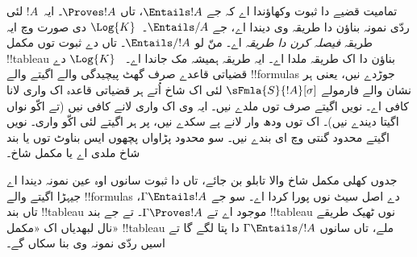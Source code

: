 \documentclass[../../../include/open-logic-section]{subfiles}
\begin{document}


\begin{explain}
  تمامیت قضیے دا ثبوت وکھاؤندا اے کہ جے $\Entails !A$، تاں
  $\Proves !A$۔ ایہ~$!A$ لئی ردّی نمونہ بناؤن دا طریقہ وی دیندا اے،
  جے $\Entails/ A$۔~$\Log{K}$ دی صورت وچ ایہ طریقہ \emph{فیصلہ کرن
    دا طریقہ} اے۔ منّ لو $\Entails/ !A$۔ تاں
   دے ثبوت توں مکمل !!{tableau}
  بناؤن دا اک طریقہ ملدا اے۔ ایہ طریقہ ہمیشہ مک جاندا اے۔
  ~$\Log{K}$ دے قضیاتی قاعدے صرف گھٹ پیچیدگی والے اگیتے والے
  !!{formula}s جوڑدے نیں، یعنی ہر نشان والے فارمولے $\sFmla{S}{!A}[\sigma]$
  لئی اک شاخ اُتے ہر قضیاتی قاعدہ اک واری لانا کافی اے۔ نویں اگیتے صرف
   توں ملدے نیں۔
  ایہ وی اک واری لانے کافی نیں (تے اکّو نواں اگیتا دیندے نیں)۔
   اک توں ودھ وار لانے پے
  سکدے نیں، پر ہر اگیتے لئی اکّو واری۔ نویں اگیتے محدود گنتی وچ ای
  بندے نیں۔ سو محدود پڑاواں پچھوں ایس بناوٹ توں یا بند شاخ ملدی اے
  یا مکمل شاخ۔

جدوں کھلی مکمل شاخ والا تابلو بن جائے، تاں
   دا ثبوت سانوں اوہ عین نمونہ
  دیندا اے جیہڑا اگیتے والے !!{formula}s دے اصل سیٹ نوں پورا کردا اے۔
  سو جے $\Gamma \Entails !A$، تاں بند !!{tableau} موجود اے تے
  $\Gamma \Proves !A$۔ تے جے بند !!{tableau} نوں ٹھیک طریقے نال لبھدیاں
  اک «مکمل» !!{tableau} ملے، تاں سانوں $\Gamma \Entails/ !A$ دا پتا
  لگے گا تے اسیں ردّی نمونہ وی بنا سکاں گے۔
\end{explain}
\end{document}
